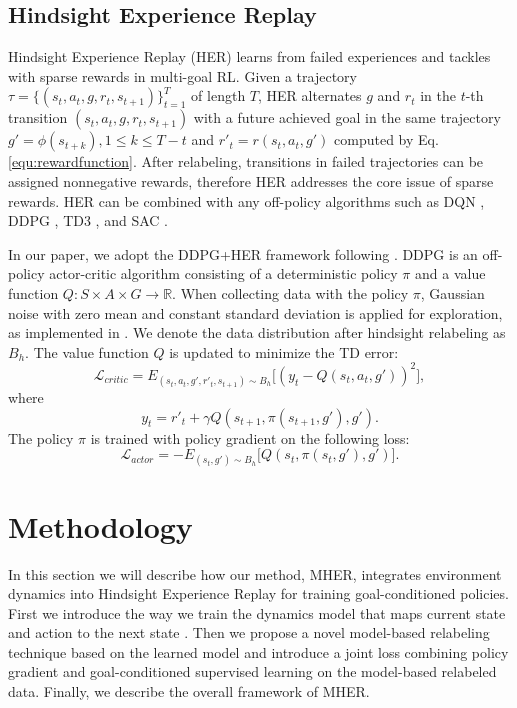 \documentclass{article}
\begin{document}
\subsection{Hindsight Experience Replay}
\label{sec:HER}
Hindsight Experience Replay (HER) learns from failed experiences and tackles with sparse rewards in multi-goal RL. Given a trajectory $\tau = \{(s_t,a_t,g, r_t,s_{t+1}) \}_{t=1}^{T}$ of length $T$, HER alternates $g$ and $r_t$ in the $t$-th transition $(s_t,a_t,g, r_t,s_{t+1})$ with a future achieved goal in the same trajectory $g'=\phi(s_{t+k}), 1 \leq k \leq T-t$ and $r'_t=r(s_t,a_t,g')$ computed by Eq. \eqref{equ:rewardfunction}. After relabeling, transitions in failed trajectories can be assigned nonnegative rewards, therefore HER addresses the core issue of sparse rewards. HER can be combined with any off-policy algorithms such as DQN \cite{mnih2015human}, DDPG \cite{lillicrap2015continuous}, TD3 \cite{fujimoto2018addressing}, and SAC \cite{haarnoja2018soft}.


In our paper, we adopt the DDPG+HER framework following \cite{andrychowicz2017hindsight,fang2019curriculum}. DDPG is an off-policy actor-critic algorithm consisting of a deterministic policy $\pi$ and a value function $Q: S\times A\times G \rightarrow \mathbb{R}$. When collecting data with the policy $\pi$, Gaussian noise with zero mean and constant standard deviation is applied for exploration, as implemented in \cite{fujimoto2018addressing}. We denote the data distribution after hindsight relabeling as $B_h$. The value function $Q$ is updated to minimize the TD error:
\begin{equation}
\label{eq:loss_critic}
\mathcal{L}_{critic}=E_{(s_t,a_t,g', r'_t,s_{t+1})\sim B_h} \big[(y_t-Q(s_t,a_t, g'))^2 \big],
\end{equation}
where
\begin{equation*}
y_t = r'_t + \gamma Q (s_{t+1}, \pi (s_{t+1}, g'), g').
\end{equation*}
The policy $\pi$ is trained with policy gradient on the following loss:
\begin{equation*}
\mathcal{L}_{actor} = -E_{(s_t,g') \sim B_h} \big[ Q(s_t, \pi(s_t,g'), g') \big].
\end{equation*}


\section{Methodology}
In this section we will describe how our method, MHER, integrates environment dynamics into Hindsight Experience Replay \cite{andrychowicz2017hindsight} for training goal-conditioned policies. First we introduce the way we train the dynamics model that maps current state and action to the next state \cite{sutton1991dyna,feinberg2018model}. Then we propose a novel model-based relabeling technique based on the learned model and introduce a joint loss combining policy gradient \cite{silver2014deterministic,lillicrap2015continuous} and goal-conditioned supervised learning \cite{ghosh2021learning} on the model-based relabeled data. Finally, we describe the overall framework of MHER.
\end{document}
